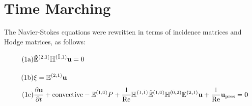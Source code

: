 \section{Time Marching}

The Navier-Stokes equations were rewritten in terms of incidence matrices and Hodge matrices, as follows:
\begin{align}
    \stepcounter{equation}
    \tag{{\theequation}a}
    \label{eq:timeContinuity}
    &\tilde{\mathbb{E}}^{(2,1)} \mathbb{H}^{(\tilde{1},1)} \mathbf{u} = 0 \vphantom{\frac{\partial^{(1)}}{\partial}} \\
    \tag{{\theequation}b}
    \label{eq:timeVorticity}
    &\xi = \mathbb{E}^{(2,1)} \mathbf{u} \vphantom{\frac{\partial^{(1)}}{\partial}} \\
    \tag{{\theequation}c}
    \label{eq:timeMomentum}
    &\frac{\partial \mathbf{u}}{\partial t} + \text{convective} - \mathbb{E}^{(1,0)} P + \frac{1}{\text{Re}} \mathbb{H}^{(1,\tilde{1})} \tilde{\mathbb{E}}^{(1,0)} \mathbb{H}^{(\tilde{0},2)} \mathbb{E}^{(2,1)} \mathbf{u} + \frac{1}{\text{Re}} \mathbf{u}_{\text{pres}} = 0
\end{align}

